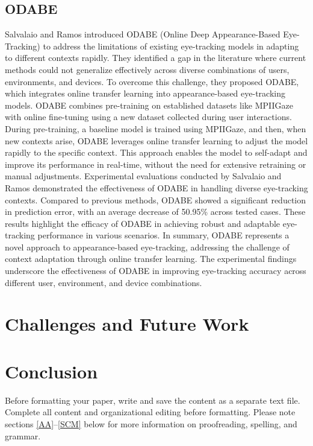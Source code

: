 \documentclass[conference]{IEEEtran}
\begin{document}
\subsection{ODABE}
Salvalaio and Ramos introduced ODABE (Online Deep Appearance-Based Eye-Tracking) \cite{IEEEhowto:odabe} to address the limitations of existing eye-tracking models in adapting to different contexts rapidly. They identified a gap in the literature where current methods could not generalize effectively across diverse combinations of users, environments, and devices. To overcome this challenge, they proposed ODABE, which integrates online transfer learning into appearance-based eye-tracking models. ODABE combines pre-training on established datasets like MPIIGaze with online fine-tuning using a new dataset collected during user interactions. During pre-training, a baseline model is trained using MPIIGaze, and then, when new contexts arise, ODABE leverages online transfer learning to adjust the model rapidly to the specific context. This approach enables the model to self-adapt and improve its performance in real-time, without the need for extensive retraining or manual adjustments. Experimental evaluations conducted by Salvalaio and Ramos demonstrated the effectiveness of ODABE in handling diverse eye-tracking contexts. Compared to previous methods, ODABE showed a significant reduction in prediction error, with an average decrease of 50.95\% across tested cases. These results highlight the efficacy of ODABE in achieving robust and adaptable eye-tracking performance in various scenarios. In summary, ODABE represents a novel approach to appearance-based eye-tracking, addressing the challenge of context adaptation through online transfer learning. The experimental findings underscore the effectiveness of ODABE in improving eye-tracking accuracy across different user, environment, and device combinations.

\section{Challenges and Future Work}
 

\section{Conclusion}
Before formatting your paper, write and save the content as a 
separate text file. Complete all content and organizational editing before 
formatting. Please note sections \ref{AA}--\ref{SCM} below for more information on 
proofreading, spelling, and grammar.
\end{document}

